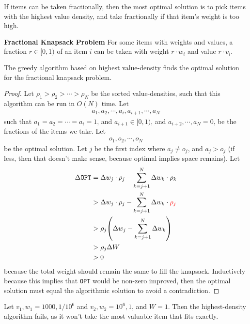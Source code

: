 If items can be taken fractionally, then the most optimal solution is to pick items with the highest value density, and take fractionally if that item's weight is too high.
\begin{definition}
    \textbf{Fractional Knapsack Problem} For some items with weights and values, a fraction $r \in [0, 1)$ of an item $i$ can be taken with weight $r\cdot w_i$ and value $r \cdot v_i$.
\end{definition}

\begin{proposition}
    The greedy algorithm based on highest value-density finds the optimal solution for the fractional knapsack problem.
\end{proposition}

\begin{proof}
    Let $\rho_1 > \rho_2 > \cdots > \rho_N$ be the sorted value-densities, such that this algorithm can be run in $O(N)$ time. Let
    \begin{align}
        a_1, a_2, \cdots, a_i, a_{i+1}, \cdots, a_N
    \end{align}
    such that $a_1 = a_2 = \cdots = a_i = 1$, and $a_{i+1} \in [0, 1)$, and $a_{i+2}, \cdots, a_N = 0$, be the fractions of the items we take. Let
    \begin{align}
        o_1, o_2, \cdots, o_N
    \end{align}
    be the optimal solution. Let $j$ be the first index where $a_j \ne o_j$, and $a_j > o_j$ (if less, then that doesn't make sense, because optimal implies space remains). Let
    \begin{align}
        \Delta \texttt{OPT} &= \Delta w_j \cdot \rho_j - \sum_{k = j+1}^N \Delta w_k \cdot \rho_k \\
        &> \Delta w_j \cdot \rho_j - \sum_{k = j+1}^N \Delta w_k \cdot \color{red} \rho_j \\
        &> \rho_j \qty(\Delta w_j - \sum_{k= j +1}^N \Delta w_k) \\
        &> \rho_j \Delta W \\
        &> 0
    \end{align}
    because the total weight should remain the same to fill the knapsack. Inductively because this implies that \texttt{OPT} would be non-zero improved, then the optimal solution must equal the algorithmic solution to avoid a contradiction.
\end{proof}

\begin{example}
    Let $v_1, w_1 = 1000, 1/10^6$ and $v_2, w_2 = 10^6, 1$, and $W = 1$. Then the highest-density algorithm fails, as it won't take the most valuable item that fits exactly.

\end{example}

